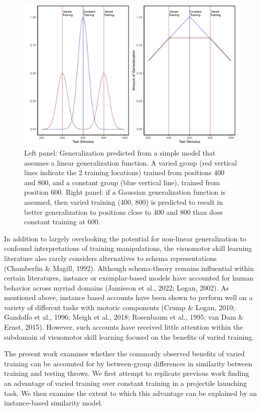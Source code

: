 \documentclass[
  jou, donotrepeattitle,floatsintext]{apa7}
\begin{document}
\begin{figure}
\includegraphics[width=\textwidth]{IGAS_PJ_files/figure-latex/ModelFig1-1} \caption{Left panel: Generalization predicted from a simple model that assumes a linear generalization function. A varied group (red vertical lines indicate the 2 training locations) trained from positions 400 and 800, and a constant group (blue vertical line), trained from position 600. Right panel: if a Gaussian generalization function is assumed, then varied training (400, 800) is predicted to result in better generalization to positions close to 400 and 800 than does constant training at 600.}\label{fig:ModelFig1}
\end{figure}

In addition to largely overlooking the potential for non-linear generalization to confound interpretations of training manipulations, the visuomotor skill learning literature also rarely considers alternatives to schema representations (Chamberlin \& Magill, 1992). Although schema-theory remains influential within certain literatures, instance or exemplar-based models have accounted for human behavior across myriad domains (Jamieson et al., 2022; Logan, 2002). As mentioned above, instance based accounts have been shown to perform well on a variety of different tasks with motoric components (Crump \& Logan, 2010; Gandolfo et al., 1996; Meigh et al., 2018; Rosenbaum et al., 1995; van Dam \& Ernst, 2015). However, such accounts have received little attention within the subdomain of visuomotor skill learning focused on the benefits of varied training.

The present work examines whether the commonly observed benefits of varied training can be accounted for by between-group differences in similarity between training and testing throws. We first attempt to replicate previous work finding an advantage of varied training over constant training in a projectile launching task. We then examine the extent to which this advantage can be explained by an instance-based similarity model.
\end{document}
